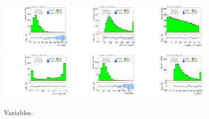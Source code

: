 \begin{figure}[tp]
  \includegraphics[width=0.32\textwidth]{figures/analysis/vbf-QCDCR/met-pt-hi}
  \includegraphics[width=0.32\textwidth]{figures/analysis/vbf-QCDCR/mMMC}
  \includegraphics[width=0.32\textwidth]{figures/analysis/vbf-QCDCR/mT}
  \includegraphics[width=0.32\textwidth]{figures/analysis/vbf-QCDCR/met-phi-centrality}
  \includegraphics[width=0.32\textwidth]{figures/analysis/vbf-QCDCR/H-pt-hi}
  \includegraphics[width=0.32\textwidth]{figures/analysis/vbf-QCDCR/mvis}
  \caption{Variables.}
  \label{fig:backgrounds-QCDCR-taus}
\end{figure}

